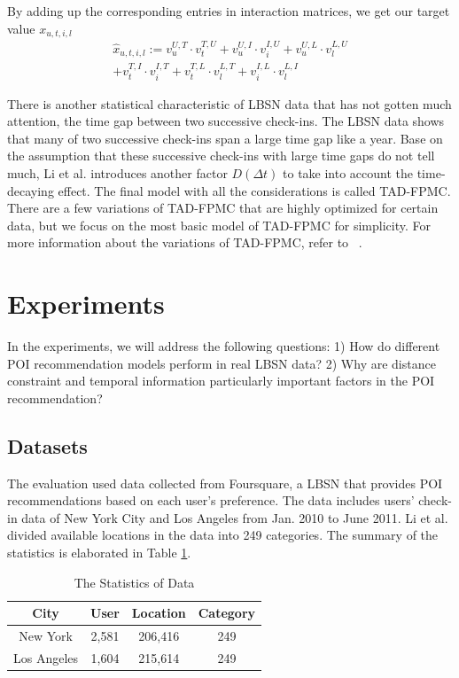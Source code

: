 \documentclass{sig-alternate}
\begin{document}
By adding up the corresponding entries in interaction matrices, we get our target value $x_{u,t,i,l}$
\begin{equation}
\begin{split}
\hat{x}_{u,t,i,l} := v_u^{U,T} \cdot v_t^{T,U} + v_u^{U,I} \cdot v_i^{I,U} + v_u^{U,L} \cdot v_l^{L,U}  \\
	                        + v_t^{T,I} \cdot v_i^{I,T} + v_t^{T,L} \cdot v_l^{L,T} + v_i^{I,L} \cdot v_l^{L,I}
\end{split}
\label{eq:TAD-FPMC}
\end{equation}

There is another statistical characteristic of LBSN data that has not gotten much attention, the time gap between 
two successive check-ins. The LBSN data shows that many of two successive check-ins span a large time gap 
like a year. Base on the assumption that these successive check-ins with large time gaps do not tell much, 
Li et al. \cite{Li:2017} introduces another factor $D(\Delta t)$ to take into account the time-decaying effect. 
The final model with all the considerations is called TAD-FPMC. There are a few variations of TAD-FPMC that 
are highly optimized for certain data, but we focus on the most basic model of TAD-FPMC for simplicity. 
For more information about the variations of TAD-FPMC, refer to ~\cite{Li:2017}.

\section{Experiments}
\label{sec:experiments}
In the experiments, we will address the following questions: 1) How do different POI recommendation 
models perform in real LBSN data? 2) Why are distance constraint and temporal information particularly important 
factors in the POI recommendation?

\subsection{Datasets}
\label{sec:datasets}
The evaluation used data collected from Foursquare, a LBSN that provides POI recommendations based on 
each user's preference. The data includes users' check-in data of New York City and Los Angeles from Jan. 
2010 to June 2011. Li et al. \cite{Li:2017} divided available locations in the data into 249 categories. 
The summary of the statistics is elaborated in Table \ref{tab:stat}. \cite{Li:2017}

\begin{table}[ht]
\centering
\caption{The Statistics of Data}
\bigskip
\label{tab:stat}
\begin{tabular}{|c|c|c|c|}
        \hline
        City & User & Location & Category \\
        \hline
        New York & 2,581 & 206,416 & 249 \\
        \hline
       Los Angeles & 1,604 & 215,614 & 249 \\
        \hline
\end{tabular}
\end{table}
\end{document}
